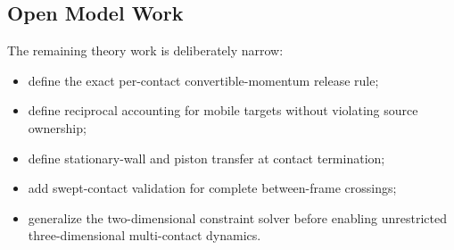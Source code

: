 \subsection{Open Model Work}

The remaining theory work is deliberately narrow:

\begin{itemize}
    \item define the exact per-contact convertible-momentum release rule;
    \item define reciprocal accounting for mobile targets without violating
          source ownership;
    \item define stationary-wall and piston transfer at contact termination;
    \item add swept-contact validation for complete between-frame crossings;
    \item generalize the two-dimensional constraint solver before enabling
          unrestricted three-dimensional multi-contact dynamics.
\end{itemize}
